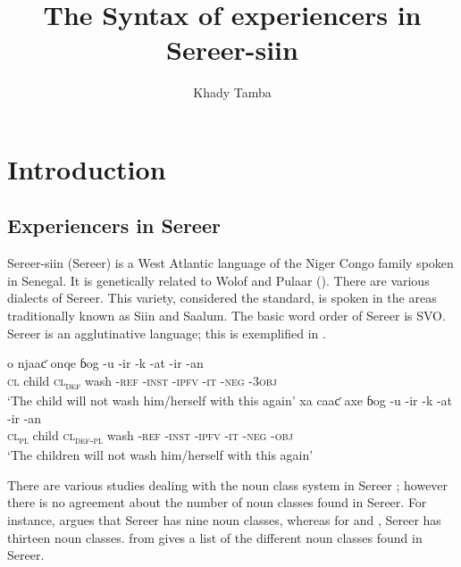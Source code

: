 \documentclass[output=paper]{langscibook}
\author{Khady Tamba\affiliation{Université Cheikh Anta Diop}}
\title{The Syntax of experiencers in Sereer-siin}
\begin{document}
 
\maketitle 

 

\section{Introduction}
\subsection{Experiencers in Sereer}

Sereer-siin (Sereer) is a West Atlantic language of the Niger Congo family spoken in Senegal. It is genetically  related to Wolof  and Pulaar (\citealt{Simons2017}). There are various dialects of Sereer. This variety, considered the standard, is spoken in the areas traditionally known as Siin and Saalum.  The basic word order of Sereer is SVO. Sereer is an agglutinative language; this is exemplified in .

\ea \label{ex:tamba:1}
\ea
\gll o          njaaƈ   onqe                            ɓog     -u            -ir               {}-k    {}-at  {}-ir    {}-an\\            
    \textsc{cl}  child  \textsc{cl\textsubscript{def}} wash   -\textsc{ref}  -\textsc{inst}    {}-\textsc{ipfv} {}-\textsc{it}  {}-\textsc{neg}   {}-\textsc{3obj}\\
\glt `The child will not wash him/herself with this again'
\ex
\gll xa   caaƈ   axe   ɓog  {}-u  {}-ir       {}-k  {}-at    -ir      {}-an \\
\textsc{cl\textsubscript{pl}}  child  \textsc{cl\textsubscript{def-pl}} wash   -\textsc{ref}  -\textsc{inst}  {}-\textsc{ipfv}   -\textsc{it}    {}-\textsc{neg}   {}-\textsc{obj}\\
\glt `The children will not wash him/herself with this again'
\z
\z
    
There are various studies dealing with the noun class system in Sereer \citep{Fal1980, Faye1979, Faye2013, Renaudier2012};  however there is no agreement about the number of noun classes found in Sereer. For instance, \citet{Faye2013} argues that Sereer has nine noun classes, whereas for \citet{Fal1980} and \citet{McLaughlin1992}, Sereer has thirteen noun classes.  from \citet[284]{McLaughlin1992} gives a list of the different noun classes found in Sereer. 
\end{document}
